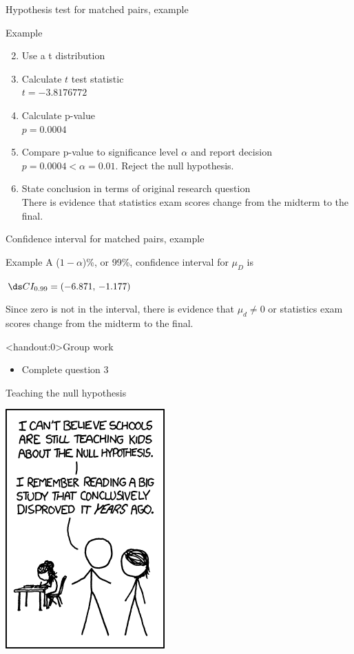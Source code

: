 \documentclass[xcolor=table]{beamer}
\begin{document}
\begin{frame}{Hypothesis test for matched pairs, example}
\begin{exampleblock}{Example}
\large
\begin{enumerate}
\setcounter{enumi}{1}

\item Use a t distribution
\pause\item Calculate $t$ test statistic\\
\pause$t=-3.8176772$
\pause\item Calculate p-value\\
\pause$p = 0.0004$
\pause\item Compare p-value to significance level $\alpha$ and report decision\\
\pause$p = 0.0004 < \alpha = 0.01$. Reject the null hypothesis.
\pause\item State conclusion in terms of original research question\\
\pause There is evidence that statistics exam scores change from the midterm to the final.
\end{enumerate}

\end{exampleblock}
\end{frame}

\begin{frame}{Confidence interval for matched pairs, example}
\begin{exampleblock}{Example}
\large
A ($1-\alpha$)\%, or 99\%, confidence interval for $\mu_D$ is\\
\pause\medskip
{\centering $\ds CI_{0.99} = (-6.871, \, -1.177)$ \par}
\medskip

\pause Since zero is not in the interval, there is evidence that $\mu_d \ne 0$ or statistics exam scores change from the midterm to the final.

\end{exampleblock}
\end{frame}

\begin{frame}<handout:0>{Group work}
\begin{block}{}
\large
\begin{itemize}
\item Complete question 3
\end{itemize}
\end{block}
\end{frame}


\begin{frame}{Teaching the null hypothesis}
\smallskip
{\centering
\includegraphics[width=2 in]{../images/ch09_null_hypothesis}
\par}
\end{frame}
\end{document}
